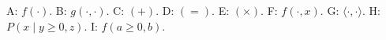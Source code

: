 \documentclass{article}
\begin{document}
A: $f(\cdot)$.
B: $g(\cdot,\cdot)$.
C: $(+)$.
D: $(=)$.
E: $(\times)$.
F: $f(\cdot,x)$.
G: $\langle\cdot,\cdot\rangle$.
H: $P(x \mid y \geq 0, z)$.
I: $f(a \geq 0, b)$.
\end{document}
